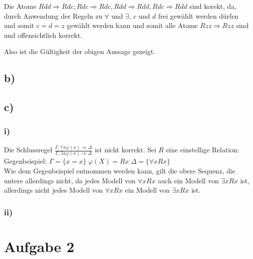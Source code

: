 \documentclass[11pt, a4paper]{article}
\begin{document}
Die Atome $Rdd \Rightarrow Rdc, Rdc \Rightarrow Rdc, Rdd \Rightarrow Rdd, Rdc \Rightarrow Rdd$ sind korekt, da, durch Anwendung der Regeln zu $\forall$ und $\exists$, $c$ und $d$ frei gewählt werden dürfen und somit $c=d=z$ gewählt werden kann und somit alle Atome $Rzz \Rightarrow Rzz$ sind und offensichtlich korrekt.

Also ist die Gültigkeit der obigen Aussage gezeigt.

\subsection*{b)}


\subsection*{c)}
\subsubsection*{i)}
Die Schlussregel $\frac{\Gamma, \forall x \varphi(x) \Rightarrow \Delta}{\Gamma, \exists x \varphi(x) \Rightarrow \Delta}$ ist nicht korrekt.
Sei $R$ eine einstellige Relation:\\
Gegenbeispiel: $\Gamma = \{x = x \}\; \varphi(X) = Rx \; \Delta = \{\forall x Rx \}$\\
Wie dem Gegenbeispiel entnommen werden kann, gilt die obere Sequenz, die untere allerdings nicht, da jedes Modell von $\forall x Rx$ auch ein Modell von $\exists x Rx$ ist, allerdings nicht jedes Modell von $\forall x Rx$ ein Modell von $\exists x Rx$ ist.

\subsubsection*{ii)}


\section*{Aufgabe 2}
\end{document}
